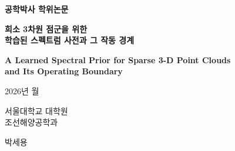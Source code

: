 \documentclass[11pt]{report}
\numberwithin{equation}{chapter}
\numberwithin{figure}{chapter}
\numberwithin{table}{chapter}
\begin{document}
\setcounter{page}{1}

\begin{titlepage}
\thispagestyle{empty}
\begin{center}

\vspace*{2cm}

{\Large \textbf{공학박사 학위논문}}

\vspace{2cm}

{\LARGE \textbf{희소 3차원 점군을 위한\\[0.3em] 학습된 스펙트럼 사전과 그 작동 경계}}

\vspace{1cm}

{\large \textbf{A Learned Spectral Prior for Sparse 3-D Point Clouds\\[0.3em]
and Its Operating Boundary}}

\vspace{3cm}

{\large 2026년 \quad 월}

\vspace{2cm}

{\large 서울대학교 대학원}\\[0.5em]
{\large 조선해양공학과}

\vspace{1.5cm}

{\large 박\quad 세\quad 용}

\end{center}
\end{titlepage}
\end{document}
